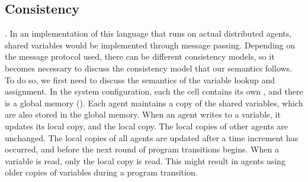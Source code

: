 \subsection{Consistency}
. In an implementation of this language that runs on actual distributed agents, shared variables would be implemented through message passing. Depending on the message protocol used, there can be different consistency models, so it becomes necessary to discuss the consistency model that our semantics follows. To do so, we first need to discuss the semantics  of the variable lookup and assignment. In the system configuration, each the  cell contains its own , and there is a global memory (). Each agent maintains a copy of the shared variables, which are also stored in the global memory. When an agent writes to a variable, it updates its local copy, and the local copy. The local copies of other agents are unchanged. The local copies of all agents are updated after a time increment has occurred, and before the next round of program transitions begins. When a variable is read, only the local copy is read. This might result in agents using older copies of variables during a program transition. 
